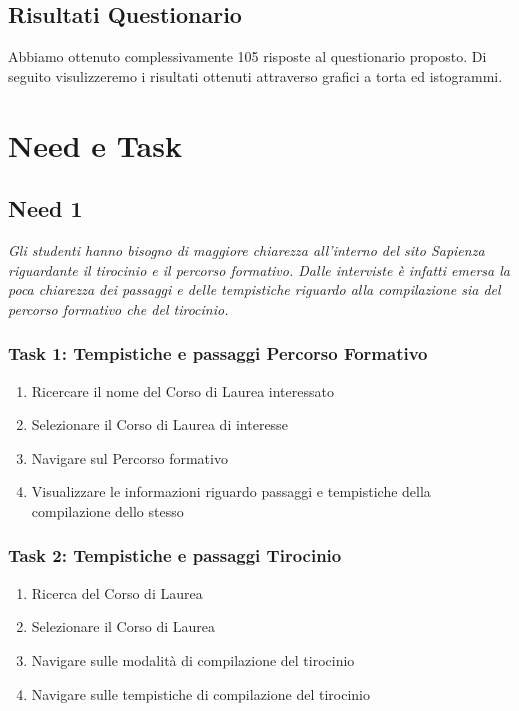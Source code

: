\subsection{Risultati Questionario}
Abbiamo ottenuto complessivamente 105 risposte al questionario proposto.
Di seguito visulizzeremo i risultati ottenuti attraverso grafici a torta ed istogrammi.



\section{Need e Task}
\subsection{Need 1}
\begin{center}
    \textit{Gli studenti hanno bisogno di maggiore chiarezza all'interno del sito Sapienza riguardante il tirocinio e il percorso formativo. Dalle interviste è infatti emersa la poca chiarezza dei passaggi e delle tempistiche riguardo alla compilazione sia del percorso formativo che del tirocinio.}
\end{center}
\subsubsection{Task 1: Tempistiche e passaggi Percorso Formativo}
\begin{enumerate}
    \item Ricercare il nome del Corso di Laurea interessato
    \item Selezionare il Corso di Laurea di interesse
    \item Navigare sul Percorso formativo
    \item Visualizzare le informazioni riguardo passaggi e tempistiche della compilazione dello stesso
\end{enumerate}

\subsubsection{Task 2: Tempistiche e passaggi Tirocinio}
\begin{enumerate}
    \item Ricerca del Corso di Laurea
    \item Selezionare il Corso di Laurea
    \item Navigare sulle modalità di compilazione del tirocinio 
    \item Navigare sulle tempistiche di compilazione del tirocinio
\end{enumerate} 

